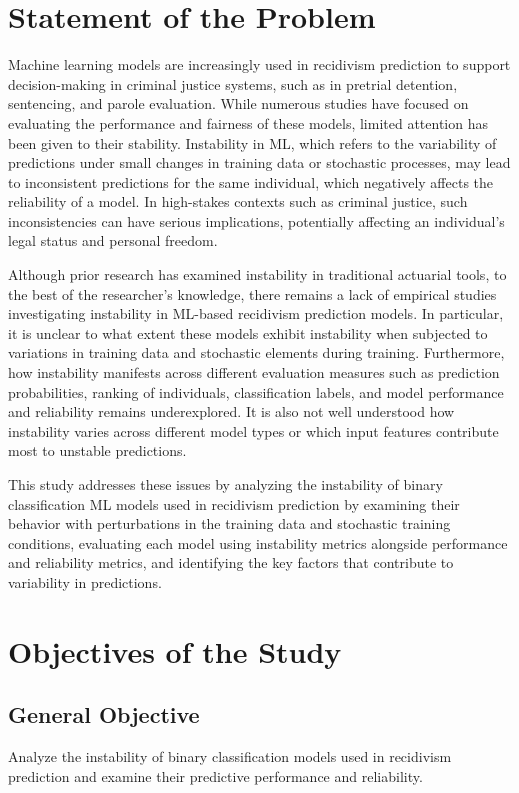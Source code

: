 \documentclass{article}
\begin{document}
\section{Statement of the Problem} %
\tab%
Machine learning models are increasingly used in recidivism prediction to support decision-making in criminal justice systems, such as in pretrial detention, sentencing, and parole evaluation. While numerous studies have focused on evaluating the performance and fairness of these models, limited attention has been given to their stability. Instability in ML, which refers to the variability of predictions under small changes in training data or stochastic processes, may lead to inconsistent predictions for the same individual, which negatively affects the reliability of a model. In high-stakes contexts such as criminal justice, such inconsistencies can have serious implications, potentially affecting an individual's legal status and personal freedom. 

Although prior research has examined instability in traditional actuarial tools, to the best of the researcher's knowledge, there remains a lack of empirical studies investigating instability in ML-based recidivism prediction models. In particular, it is unclear to what extent these models exhibit instability when subjected to variations in training data and stochastic elements during training. Furthermore, how instability manifests across different evaluation measures such as prediction probabilities, ranking of individuals, classification labels, and model performance and reliability remains underexplored. It is also not well understood how instability varies across different model types or which input features contribute most to unstable predictions.

This study addresses these issues by analyzing the instability of binary classification ML models used in recidivism prediction by examining their behavior with perturbations in the training data and stochastic training conditions, evaluating each model using instability metrics alongside performance and reliability metrics, and identifying the key factors that contribute to variability in predictions.

\section{Objectives of the Study} %
\subsection{General Objective} Analyze the instability of binary classification models used in recidivism prediction and examine their predictive performance and reliability.
\end{document}
